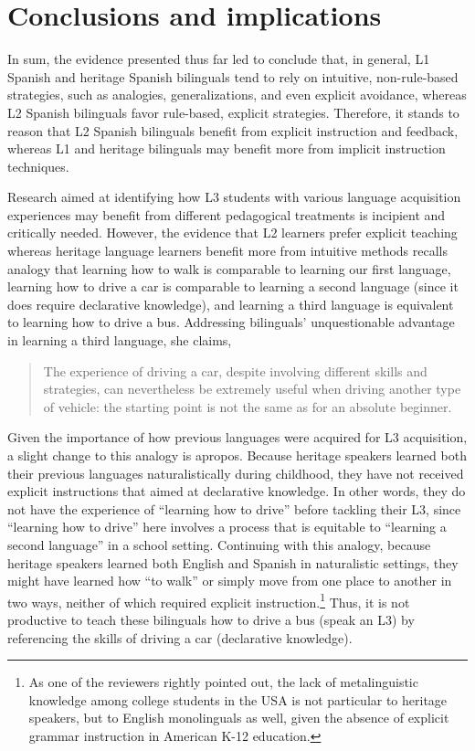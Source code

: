 \documentclass[output=paper]{../langscibook}
\begin{document}
\section{Conclusions and implications}


In sum, the evidence presented thus far led \citet{CarvalhoChild2018} to conclude that, in general, L1 Spanish and heritage Spanish bilinguals tend to rely on intuitive, non-rule-based strategies, such as analogies, generalizations, and even explicit avoidance, whereas L2 Spanish bilinguals favor rule-based, explicit strategies. Therefore, it stands to reason that L2 Spanish bilinguals benefit from explicit instruction and feedback, whereas L1 and heritage bilinguals may benefit more from implicit instruction techniques.

Research aimed at identifying how L3 students with various language acquisition experiences may benefit from different pedagogical treatments is incipient and critically needed. However, the evidence that L2 learners prefer explicit teaching whereas heritage language learners benefit more from intuitive methods recalls  analogy that learning how to walk is comparable to learning our first language, learning how to drive a car is comparable to learning a second language (since it does require declarative knowledge), and learning a third language is equivalent to learning how to drive a bus. Addressing bilinguals’ unquestionable advantage in learning a third language, she claims, 

\begin{quote}
The experience of driving a car, despite involving different skills and strategies, can nevertheless be extremely useful when driving another type of vehicle: the starting point is not the same as for an absolute beginner. \citep[73]{Cenoz2013Influence}
\end{quote}

Given the importance of how previous languages were acquired for L3 acquisition, a slight change to this analogy is apropos. Because heritage speakers learned both their previous languages naturalistically during childhood, they have not received explicit instructions that aimed at declarative knowledge. In other words, they do not have the experience of “learning how to drive” before tackling their L3, since “learning how to drive” here involves a process that is equitable to “learning a second language” in a school setting. Continuing with this analogy, because heritage speakers learned both English and Spanish in naturalistic settings, they might have learned how “to walk” or simply move from one place to another in two ways, neither of which required explicit instruction.\footnote{As one of the reviewers rightly pointed out, the lack of metalinguistic knowledge among college students in the USA is not particular to heritage speakers, but to English monolinguals as well, given the absence of explicit grammar instruction in American K-12 education.} Thus, it is not productive to teach these bilinguals how to drive a bus (speak an L3) by referencing the skills of driving a car (declarative knowledge).
\end{document}
